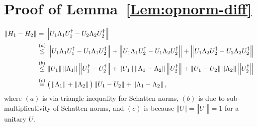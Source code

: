 \documentclass[a4paper,onecolumn,11pt,accepted=2026-05-12]{quantumarticle}
\newcommand{\norm}[1]{\left\Vert#1\right\Vert}
\begin{document}
\section{Proof of Lemma~\ref{Lem:opnorm-diff}}\label{Sec:Lem:opnorm-diff-proof}
\vspace{-20 pt}
\begin{align}
    \norm{H_1-H_2} 
&= \norm{U_1 \Lambda_1 U_1^{\dag}-U_2 \Lambda_2 U_2^{\dag}} \notag \\
    &\stackrel{(a)}{\leq}   \norm{U_1 \Lambda_1 U_1^{\dag}-U_1 \Lambda_1 U_2^{\dag}}+\norm{U_1 \Lambda_1 U_2^{\dag}-U_1 \Lambda_2 U_2^{\dag}}+\norm{U_1 \Lambda_2 U_2^{\dag}-U_2 \Lambda_2 U_2^{\dag}} \notag \\
    & \stackrel{(b)}{\leq}  \norm{U_1} \norm{\Lambda_1}\norm{U_1^{\dag}- U_2^{\dag}}+\norm{U_1} \norm{\Lambda_1- \Lambda_2} \norm{U_2^{\dag}}+\norm{U_1-U_2} \norm{\Lambda_2} \norm{U_2^{\dag}} \notag \\
    &\stackrel{(c)}{=}  \big(\norm{\Lambda_1}+\norm{\Lambda_2}\big)\norm{U_1- U_2} +\norm{\Lambda_1- \Lambda_2}, \notag
\end{align}
where $(a)$ is via triangle inequality for Schatten norms, $(b)$ is due to sub-multiplicativity of Schatten norms, and $(c)$ is because $\norm{U}=\norm{U^{\dag}}=1$ for a unitary $U$.
\end{document}

